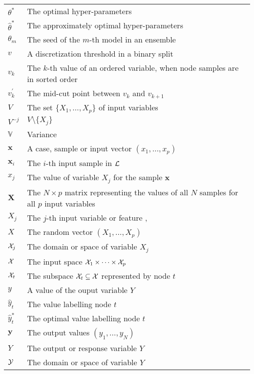 \begin{tabularx}{\textwidth}{ l X }
$\theta^*$ & The optimal hyper-parameters \dotfill  \pageref{ntn:theta-star}\\
$\widehat{\theta}^*$ & The approximately optimal hyper-parameters \dotfill  \pageref{ntn:theta-star-approx}\\
$\theta_m$ & The seed of the $m$-th model in an ensemble \dotfill  \pageref{ntn:theta-seed-m}\\
$v$ & A discretization threshold in a binary split \dotfill  \pageref{ntn:v}\\
$v_k$ & The $k$-th value of an ordered variable, when node samples are in sorted order \dotfill  \pageref{ntn:v_k}\\
$v_k^\prime$ & The mid-cut point between $v_k$ and $v_{k+1}$ \dotfill  \pageref{ntn:v_k_prime}\\
$V$ & The set $\{X_1, \dots, X_p\}$ of input variables \dotfill  \pageref{ntn:V}\\
$V^{-j}$ & $V \setminus \{X_j\}$ \dotfill  \pageref{ntn:V-j}\\
$\mathbb{V}$ & Variance \dotfill \\
$\textbf{x}$ & A case, sample or input vector $(x_1, \dots, x_p)$ \dotfill  \pageref{ntn:sample-x}\\
$\textbf{x}_i$ & The $i$-th input sample in ${\cal L}$ \dotfill  \pageref{ntn:sample-x_i}\\
$x_j$ & The value of variable $X_j$ for the sample $\textbf{x}$ \dotfill  \pageref{ntn:value-x_j}\\
$\textbf{X}$ & The $N\times p$ matrix representing the values of all $N$ samples for all $p$ input variables \dotfill  \pageref{ntn:matrix-X}\\
$X_j$ & The $j$-th input variable or feature \dotfill  \pageref{ntn:var-X_j}, \pageref{ntn:var-X_j2}\\
$X$ & The random vector $(X_1,\dots,X_p)$ \dotfill  \pageref{ntn:vector-X}\\
${\cal X}_j$ & The domain or space of variable $X_j$ \dotfill  \pageref{ntn:space-X_j}\\
${\cal X}$ & The input space ${\cal X}_1 \times \dots \times {\cal X}_p$ \dotfill  \pageref{ntn:space-X}\\
${\cal X}_t$ & The subspace ${\cal X}_t \subseteq {\cal X}$ represented by node $t$ \dotfill  \pageref{ntn:node-space}\\
$y$ & A value of the ouput variable $Y$ \dotfill  \pageref{ntn:value-y}\\
$\widehat{y}_t$ & The value labelling node $t$ \dotfill  \pageref{ntn:y_t}\\
$\widehat{y}_t^*$ & The optimal value labelling node $t$ \dotfill  \pageref{ntn:y_t-star}\\
$\mathbf{y}$ & The output values $(y_1,\dots,y_N)$ \dotfill  \pageref{ntn:vector-y}\\
$Y$ & The output or response variable $Y$ \dotfill  \pageref{ntn:var-Y}\\
${\cal Y}$ & The domain or space of variable $Y$ \dotfill  \pageref{ntn:space-Y}\\
\end{tabularx}
